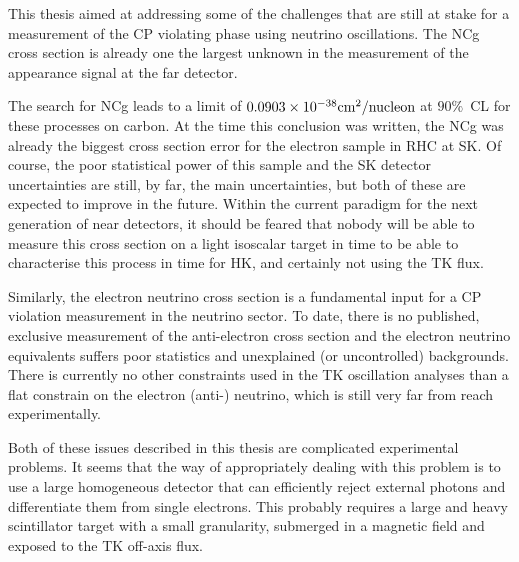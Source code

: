 
This thesis aimed at addressing some of the challenges that are still
at stake for a measurement of the \Gls{CP} violating phase using
neutrino oscillations. The \Gls{NCg} cross section is already one the
largest unknown in the measurement of the appearance signal at the far
detector.

The search for \Gls{NCg} leads to a limit of $0.0903 \times 10^{-38} \text{cm}^{2} / \text{nucleon}$ at
$90\%$~\Gls{CL} for these processes on carbon. At the time this
conclusion was written, the \Gls{NCg} was already the biggest cross
section error for the electron sample in \Gls{RHC} at \Gls{SK}. Of
course, the poor statistical power of this sample and the \Gls{SK}
detector uncertainties are still, by far, the main uncertainties, but
both of these are expected to improve in the future. Within the
current paradigm for the next generation of near detectors, it should
be feared that nobody will be able to measure this cross section on a
light isoscalar target in time to be able to characterise this process
in time for \Gls{HK}, and certainly not using the \Gls{TK} flux.

Similarly, the electron neutrino cross section is a fundamental input
for a \Gls{CP} violation measurement in the neutrino sector. To date,
there is no published, exclusive measurement of the anti-electron cross
section and the electron neutrino equivalents suffers poor statistics
and unexplained (or uncontrolled) backgrounds. There is currently no
other constraints used in the \Gls{TK} oscillation analyses than a
flat constrain on the electron (anti-) neutrino, which is still very
far from reach experimentally.

Both of these issues described in this thesis are complicated
experimental problems. It seems that the way of appropriately dealing
with this problem is to use a large homogeneous detector that can
efficiently reject external photons and differentiate them from single
electrons. This probably requires a large and heavy scintillator
target with a small granularity, submerged in a magnetic field and
exposed to the \Gls{TK} off-axis flux.